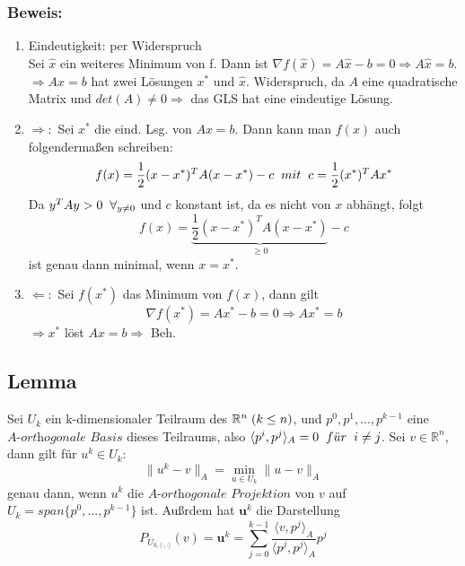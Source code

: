 \documentclass{article}
\begin{document}
\subsubsection{Beweis:}
\begin{enumerate}
\item Eindeutigkeit: per Widerspruch
\\Sei $\hat x$ ein weiteres Minimum von f. Dann ist $\nabla f(\hat x) = A\hat x - b = 0 \Rightarrow A\hat x = b$.
\\$\Rightarrow Ax = b$ hat zwei Lösungen $x^{*}$ und $\hat x$. Widerspruch, da $A$ eine quadratische Matrix und $det(A) \ne 0 \Rightarrow $ das GLS hat eine eindeutige Lösung.
\item $\Rightarrow:$ Sei $x^{*}$ die eind. Lsg. von $Ax = b$. Dann kann man $f(x)$ auch folgenderma{\ss}en schreiben:
$$f(x) = \frac 1 2 (x - x^{*})^{T}A(x - x^{*}) - c \hspace{2mm} mit \hspace{2mm} c = \frac 1 2 (x^{*})^{T}Ax^{*}$$
Da $y^{T}Ay > 0 \hspace{2mm} \forall _{y \ne 0}$ und $c$ konstant ist, da es nicht von $x$ abhängt, folgt
$$f(x) = \underbrace {\frac 1 2 (x - x^{*})^{T}A(x - x^{*})}_{\ge 0} - c$$
ist genau dann minimal, wenn $x = x^{*}$.
\item $\Leftarrow:$ Sei $f(x^{*})$ das Minimum von $f(x)$, dann gilt
$$\nabla f(x^{*}) = Ax^{*} - b = 0 \Rightarrow Ax^{*} = b$$
$\Rightarrow x^{*}$ löst $Ax = b \Rightarrow$ Beh.
\end{enumerate}

\subsection{Lemma}
Sei $U_{k}$ ein k-dimensionaler Teilraum des $\mathbb{R}^{n} \hspace{1mm} (k \le n)$, und $p^{0}, p^{1},...,p^{k-1}$ eine $\textit{A-orthogonale Basis}$ dieses Teilraums, also $\langle p^{i}, p^{j} \rangle _{A} = 0 \hspace{2mm} f\ddot{u}r \hspace{2mm} i \ne j$. Sei $v \in \mathbb{R}^{n}$, dann gilt für $u^{k} \in U_{k}$:
\begin{equation}
\|u^{k} - v\|_{A} = \underset{u \in U_{k}}{\min} \|u - v\|_{A}
\end{equation}
genau dann, wenn $u^{k}$ die $\textit{A-orthogonale Projektion}$ von $v$ auf $U_{k} = span\{p^{0},...,p^{k-1}\}$ ist. Außrdem hat $\textbf{u}^{k}$ die Darstellung
\begin{equation}
P_{U_{k,\langle \cdot,\cdot \rangle}}(v) = \textbf{u}^{k} = \sum_{j=0}^{k-1} \frac {\langle v, p^{j} \rangle _{A}} {\langle p^{j}, p^{j} \rangle _{A}} p^{j}
\end{equation}
\end{document}
